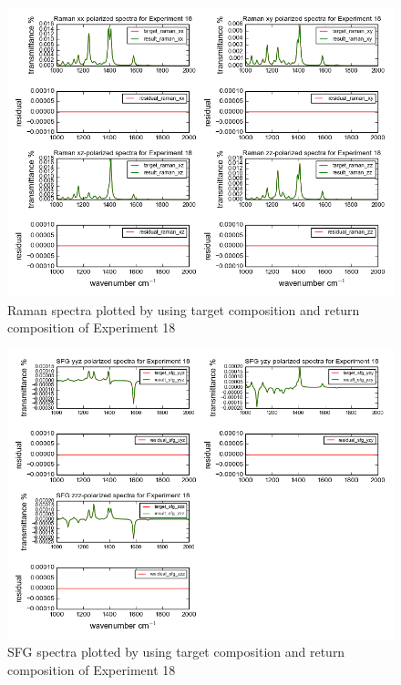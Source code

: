 \begin{figure}[!ht] 
\centering
\includegraphics[scale=0.7]{Figures/chapter4_result_target_plotting_500datapoint_raman.png}
\caption{Raman spectra plotted by using target composition and return composition of Experiment 18} \label{fig:4.6}
\end{figure}

\begin{figure}[!ht] 
\centering
\includegraphics[scale=0.7]{Figures/chapter4_result_target_plotting_500datapoint_sfg.png}
\caption{SFG spectra plotted by using target composition and return composition of Experiment 18} \label{fig:4.7}
\end{figure} 

